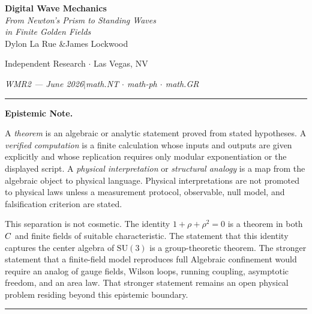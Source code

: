 \begin{center}
\vspace*{0.5em}
{\LARGE\bfseries Digital Wave Mechanics}\\[12pt]
{\large\itshape From Newton's Prism to Standing Waves\\
in Finite Golden Fields}\\[8pt]

\vspace{1.5em}
{\large Dylon La Rue \quad\&\quad James Lockwood}

\vspace{0.5em}
{\small Independent Research $\cdot$ Las Vegas, NV}

\vspace{0.5em}
{\small\itshape WMR2 --- June 2026\quad$|$\quad math.NT $\cdot$ math-ph $\cdot$ math.GR}
\end{center}

\vspace{1em}

\newpage

\newpage

\vspace{0.5em}
\noindent\rule{\linewidth}{0.4pt}
{\small\noindent\textbf{Epistemic Note.}

A \emph{theorem} is an algebraic or analytic statement proved from stated hypotheses. A \emph{verified computation} is a finite calculation whose inputs and outputs are given explicitly and whose replication requires only modular exponentiation or the displayed script. A \emph{physical interpretation} or \emph{structural analogy} is a map from the algebraic object to physical language. Physical interpretations are not promoted to physical laws unless a measurement protocol, observable, null model, and falsification criterion are stated.

This separation is not cosmetic. The identity $1 + \rho + \rho^2 = 0$ is a theorem in both $C$ and finite fields of suitable characteristic. The statement that this identity captures the center algebra of $\mathrm{SU}(3)$ is a group-theoretic theorem. The stronger statement that a finite-field model reproduces full Algebraic confinement would require an analog of gauge fields, Wilson loops, running coupling, asymptotic freedom, and an area law. That stronger statement remains an open physical problem residing beyond this epistemic boundary.}
\noindent\rule{\linewidth}{0.4pt}
\vspace{0.5em}

